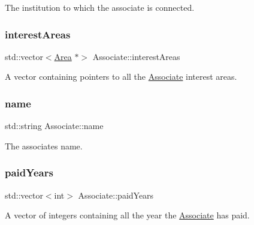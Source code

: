 The institution to which the associate is connected. 

\mbox{\label{classAssociate_aa4083f0fff7ce7d580f7e2df8f9dbaf2}} 
\subsubsection{\texorpdfstring{interest\+Areas}{interestAreas}}
{\footnotesize\ttfamily std\+::vector$<$\mbox{\hyperlink{classArea}{Area}} $\ast$$>$ Associate\+::interest\+Areas\hspace{0.3cm}{\ttfamily [private]}}



A vector containing pointers to all the \mbox{\hyperlink{classAssociate}{Associate}} interest areas. 

\mbox{\label{classAssociate_ad52875abacf1836cd879b7dffb88d589}} 
\subsubsection{\texorpdfstring{name}{name}}
{\footnotesize\ttfamily std\+::string Associate\+::name\hspace{0.3cm}{\ttfamily [private]}}



The associate\textquotesingle{}s name. 

\mbox{\label{classAssociate_ad7d373d77a5c49eb845e89729962c30d}} 
\subsubsection{\texorpdfstring{paid\+Years}{paidYears}}
{\footnotesize\ttfamily std\+::vector$<$int$>$ Associate\+::paid\+Years\hspace{0.3cm}{\ttfamily [private]}}



A vector of integers containing all the year the \mbox{\hyperlink{classAssociate}{Associate}} has paid. 

\mbox{\label{classAssociate_adc7e2decb409cd226e1508c1c5df3b90}} 
